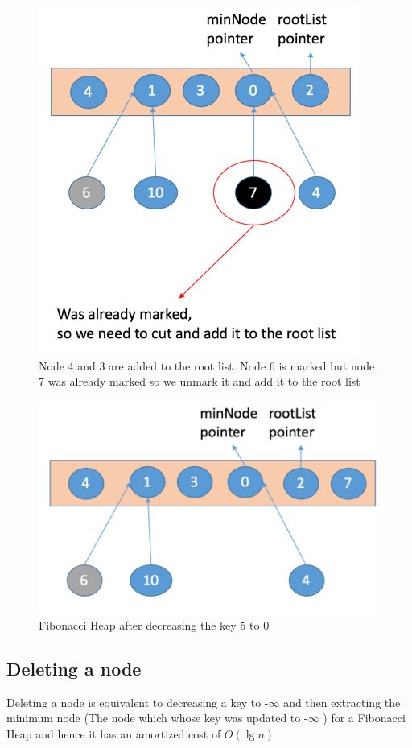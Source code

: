 \begin{figure}[h]
	\centering 
	\includegraphics[width=0.95\columnwidth,height=0.75\columnwidth]{Figures/FibonacciHeapDecreaseKeyVilolation3Operation}
	\caption{Node 4 and 3 are added to the root list. Node 6 is marked but node 7 was already marked so we unmark it and add it to the root list}
	\label {fig:decreaseKey3Violation}
\end{figure}
\begin{figure}[h]
	\centering \includegraphics[width=0.95\columnwidth,height=0.75\columnwidth]{Figures/FibonacciHeapDecreaseKeyVilolation4Operation}
	\caption{Fibonacci Heap after decreasing the key 5 to 0}
	\label {fig:decreaseKey4Violation}
\end{figure}


\subsection{Deleting a node}
Deleting a node is equivalent to decreasing a key to -$ \infty $ and then extracting the minimum node (The node which whose key was updated to -$ \infty $ ) for a Fibonacci Heap and hence it has an amortized cost of $O(\lg{n})$ \\ \\ 